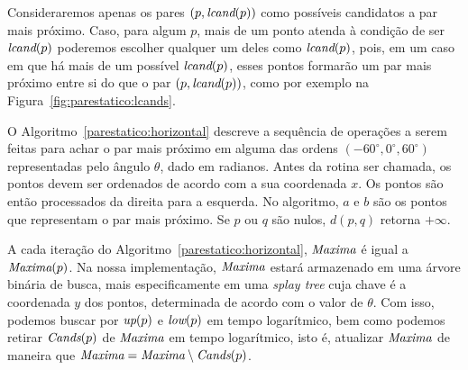 

Consideraremos apenas os pares $(p, \textit{lcand}(p))$ como possíveis candidatos a par mais próximo.
Caso, para algum $p$, mais de um ponto atenda à condição de ser $\textit{lcand}(p)$ poderemos escolher
qualquer um deles como $\textit{lcand}(p)$, pois, em um caso em que há mais de um possível $\textit{lcand}(p)$,
esses pontos formarão um par mais próximo entre si do que o par $(p, \textit{lcand}(p))$, como por exemplo
na Figura~\ref{fig:parestatico:lcands}.



O Algoritmo~\ref{parestatico:horizontal} descreve a sequência de operações a serem feitas para
achar o par mais próximo em alguma das ordens $(-60^\circ, 0^\circ, 60^\circ)$ representadas pelo
ângulo $\theta$, dado em radianos.
Antes da rotina ser chamada, os pontos devem ser ordenados de acordo com a sua coordenada $x$.
Os pontos são então processados da direita para a esquerda.
No algoritmo, $a$ e $b$ são os pontos que representam o par mais próximo.
Se $p$ ou $q$ são nulos, $d(p,q)$ retorna $+\infty$.

A cada iteração do Algoritmo~\ref{parestatico:horizontal}, $\textit{Maxima}$ é igual a $\textit{Maxima}(p)$.
Na nossa implementação, $\textit{Maxima}$ estará armazenado em uma árvore binária de busca, mais
especificamente em uma \textit{splay tree} cuja chave é a coordenada $y$ dos pontos, determinada
de acordo com o valor de $\theta$.
Com isso, podemos buscar por $\textit{up}(p)$ e $\textit{low}(p)$ em tempo logarítmico, bem como podemos retirar
$\textit{Cands}(p)$ de $\textit{Maxima}$ em tempo logarítmico, isto é, atualizar $\textit{Maxima}$ de maneira que $\textit{Maxima}
= \textit{Maxima} \setminus \textit{Cands}(p)$.



